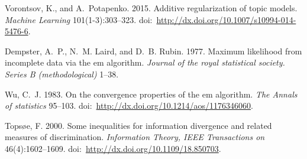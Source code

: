 \documentclass[12pt, twoside]{article}
\begin{document}
\begin{thebibliography}{10}
Vorontsov, K.,  and A.~Potapenko.
2015.
Additive regularization of topic models.
\emph{Machine Learning}
101(1-3):303--323.
doi:~\url{http://dx.doi.org/10.1007/s10994-014-5476-6}.

Dempster, A.~P., N.~M. Laird,  and D.~B. Rubin.
1977.
Maximum likelihood from incomplete data via the em algorithm.
\emph{Journal of the royal statistical society. Series B (methodological)}
1--38.

Wu, C.~J.
1983.
On the convergence properties of the em algorithm.
\emph{The Annals of statistics}
95--103.
doi:~\url{http://dx.doi.org/10.1214/aos/1176346060}.

Tops{\o}e, F.
2000.
Some inequalities for information divergence and related measures of
  discrimination.
\emph{Information Theory, IEEE Transactions on}
46(4):1602--1609.
doi:~\url{http://dx.doi.org/10.1109/18.850703}.

\end{thebibliography}
\end{document}
